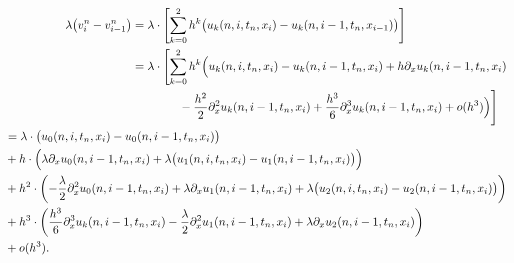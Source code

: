{\footnotesize\begin{align}\nonumber
\begin{split}
\lambda \bigl( v^n_i - v^n_{i-1} \bigr)
&= \lambda \cdot \Biggl[ \sum_{k=0}^2 h^k \bigl( u_k(n, i, t_n, x_i) - u_k(n, i-1, t_n, x_{i-1}) \bigr) \Biggr]\\
&= \lambda \cdot \Biggl[ \sum_{k=0}^2 h^k \Bigl( u_k(n, i, t_n, x_i) - u_k(n, i-1, t_n, x_i) + h \partial_x u_k(n, i-1, t_n, x_i)\\
&\qquad \qquad - \frac{h^2}{2} \partial^2_x u_k(n, i-1, t_n, x_i) + \frac{h^3}{6} \partial^3_x u_k(n, i-1, t_n, x_i) + o(h^3) \Bigr) \Biggr]
\end{split}\\
\label{eq:transport:diskret:diff2}
\begin{split}
&= \lambda \cdot \bigl( u_0(n, i, t_n, x_i) - u_0(n, i-1, t_n, x_i) \bigr)\\
&+ h \cdot \Bigl(\lambda \partial_x u_0(n, i-1, t_n, x_i) + \lambda \bigl( u_1(n, i, t_n, x_i) - u_1(n, i-1, t_n, x_i)\bigr)\Bigr)\\
&+ h^2 \cdot \left( - \frac{\lambda}{2} \partial^2_x u_0(n, i-1, t_n, x_i) + \lambda \partial_x u_1(n, i-1, t_n, x_i) + \lambda \bigl( u_2(n, i, t_n, x_i) - u_2(n, i-1, t_n, x_i)\bigr)\right)\\
&+ h^3 \cdot \left( \frac{h^3}{6} \partial^3_x u_k(n, i-1, t_n, x_i) - \frac{\lambda}{2} \partial^2_x u_1(n, i-1, t_n, x_i) + \lambda \partial_x u_2(n, i-1, t_n, x_i) \right)\\
&+ o(h^3).
\end{split}
\end{align}}
